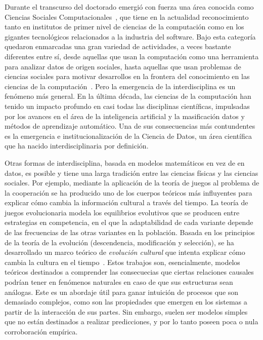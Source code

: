 \documentclass[a4paper,11pt]{book}
\theoremstyle{definition}
\begin{document}
Durante el transcurso del doctorado emergió con fuerza una área conocida como Ciencias Sociales Computacionales~\cite{lazer2009-computationalSocialScience}, que tiene en la actualidad reconocimiento tanto en institutos de primer nivel de ciencias de la computación como en los gigantes tecnológicos relacionados a la industria del software.
%
Bajo esta categoría quedaron enmarcadas una gran variedad de actividades, a veces bastante diferentes entre sí, desde aquellas que usan la computación como una herramienta para analizar datos de origen sociales, hasta aquellas que usan problemas de ciencias sociales para motivar desarrollos en la frontera del conocimiento en las ciencias de la computación~\cite{lazer2020-computationalSocialScience}.
%
Pero la emergencia de la interdisciplina es un fenómeno más general.
%
En la última década, las ciencias de la computación han tenido un impacto profundo en casi todas las disciplinas científicas, impulsadas por los avances en el área de la inteligencia artificial y la masificación datos y métodos de aprendizaje automático.
%
Una de sus consecuencias más contundentes es la emergencia e institucionalización de la Ciencia de Datos, un área científica que ha nacido interdisciplinaria por definición.


Otras formas de interdisciplina, basada en modelos matemáticos en vez de en datos, es posible y tiene una larga tradición entre las ciencias físicas y las ciencias sociales.
%
Por ejemplo, mediante la aplicación de la teoría de juegos al problema de la cooperación se ha producido uno de los cuerpos teóricos más influyentes  para explicar cómo cambia la información cultural a través del tiempo.
%
La teoría de juegos evolucionaria \cite{taylor1978-replicatorDynamic, maynardSmith1982-evolutionGameTheory} modela los equilibrios evolutivos que se producen entre estrategias en competencia, en el que la adaptabilidad de cada variante depende de las frecuencias de las otras variantes en la población.
%
Basada en los principios de la teor\'ia de la evoluci\'on (descendencia, modificaci\'on y selecci\'on), se ha desarrollado un marco te\'orico de \emph{evoluci\'on cultural} que intenta explicar c\'omo cambia la cultura en el tiempo~\cite{boyd1985-evolutionaryProcess, boyd2005-origin}.
%
Estos trabajos son, esencialmente, modelos teóricos destinados a comprender las consecuecias que ciertas relaciones causales podrían tener en fenómenos naturales en caso de que sus estructuras sean análogas.
%
Este es un abordaje útil para ganar intuición de procesos que son demasiado complejos, como son las propiedades que emergen en los sistemas a partir de la interacción de sus partes.
%
Sin embargo, suelen ser modelos simples que no están destinados a realizar predicciones, y por lo tanto poseen poca o nula corroboración empírica.
\end{document}
